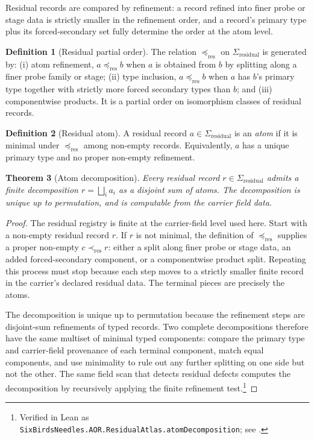 \documentclass[11pt]{article}
\newcommand{\Sigres}{\Sigma_{\mathrm{residual}}}
\newtheorem{theorem}{Theorem}[section]
\theoremstyle{definition}
\newtheorem{definition}[theorem]{Definition}
\begin{document}
Residual records are compared by refinement: a record refined into finer
probe or stage data is strictly smaller in the refinement order, and a
record's primary type plus its forced-secondary set fully determine the
order at the atom level.

\begin{definition}[Residual partial order]\label{def:aor:residual-partial-order}
The relation $\preceq_{\mathrm{res}}$ on $\Sigres$ is generated by:
(i) atom refinement, $a\preceq_{\mathrm{res}}b$ when $a$ is obtained
from $b$ by splitting along a finer probe family or stage; (ii) type
inclusion, $a\preceq_{\mathrm{res}}b$ when $a$ has $b$'s primary type
together with strictly more forced secondary types than $b$; and
(iii) componentwise products.  It is a partial order on isomorphism
classes of residual records.
\end{definition}

\begin{definition}[Residual atom]\label{def:aor:residual-atom}
A residual record $a\in\Sigres$ is an \emph{atom} if it is minimal
under $\preceq_{\mathrm{res}}$ among non-empty records.  Equivalently,
$a$ has a unique primary type and no proper non-empty refinement.
\end{definition}

\begin{theorem}[Atom decomposition]\label{thm:aor:atom-decomposition}
Every residual record $r\in\Sigres$ admits a finite decomposition
$r=\bigsqcup_{i} a_i$ as a disjoint sum of atoms.  The decomposition is
unique up to permutation, and is computable from the carrier field
data.
\end{theorem}

\begin{proof}
The residual registry is finite at the carrier-field level used here.  Start
with a non-empty residual record \(r\).  If \(r\) is not minimal, the
definition of \(\preceq_{\mathrm{res}}\) supplies a proper non-empty
\(c\prec_{\mathrm{res}} r\): either a split along finer probe or stage data,
an added forced-secondary component, or a componentwise product split.
Repeating this process must stop because each step moves to a strictly
smaller finite record in the carrier's declared residual data.  The terminal
pieces are precisely the atoms.

The decomposition is unique up to permutation because the refinement steps
are disjoint-sum refinements of typed records.  Two complete decompositions
therefore have the same multiset of minimal typed components: compare the
primary type and carrier-field provenance of each terminal component, match
equal components, and use minimality to rule out any further splitting on
one side but not the other.  The same field scan that detects residual
defects computes the decomposition by recursively applying the finite
refinement test.\footnote{Verified in Lean as \texttt{SixBirdsNeedles.AOR.ResidualAtlas.atomDecomposition}; see .}
\end{proof}
\end{document}
